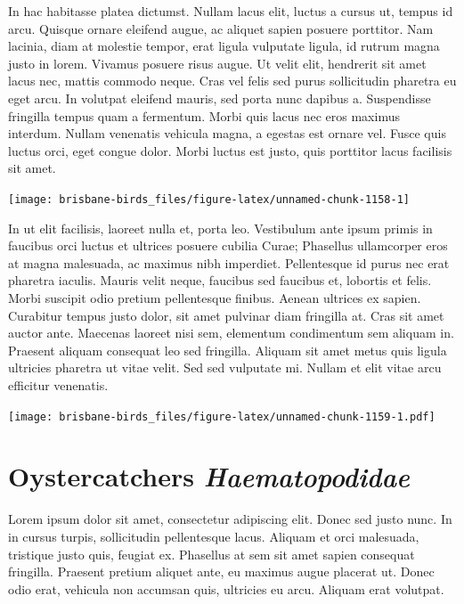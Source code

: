 \documentclass[]{book}
\let\origfigure\figure
\let\endorigfigure\endfigure
\renewenvironment{figure}[1][2] {
  \expandafter\origfigure\expandafter[H]
} {
  \endorigfigure
}
\begin{document}
In hac habitasse platea dictumst. Nullam lacus elit, luctus a cursus ut,
tempus id arcu. Quisque ornare eleifend augue, ac aliquet sapien posuere
porttitor. Nam lacinia, diam at molestie tempor, erat ligula vulputate
ligula, id rutrum magna justo in lorem. Vivamus posuere risus augue. Ut
velit elit, hendrerit sit amet lacus nec, mattis commodo neque. Cras vel
felis sed purus sollicitudin pharetra eu eget arcu. In volutpat eleifend
mauris, sed porta nunc dapibus a. Suspendisse fringilla tempus quam a
fermentum. Morbi quis lacus nec eros maximus interdum. Nullam venenatis
vehicula magna, a egestas est ornare vel. Fusce quis luctus orci, eget
congue dolor. Morbi luctus est justo, quis porttitor lacus facilisis sit
amet.

\begin{figure}
\texttt{[image: brisbane-birds\_files/figure-latex/unnamed-chunk-1158-1]} \caption{insert figure caption}\label{fig:unnamed-chunk-1158}
\end{figure}

In ut elit facilisis, laoreet nulla et, porta leo. Vestibulum ante ipsum
primis in faucibus orci luctus et ultrices posuere cubilia Curae;
Phasellus ullamcorper eros at magna malesuada, ac maximus nibh
imperdiet. Pellentesque id purus nec erat pharetra iaculis. Mauris velit
neque, faucibus sed faucibus et, lobortis et felis. Morbi suscipit odio
pretium pellentesque finibus. Aenean ultrices ex sapien. Curabitur
tempus justo dolor, sit amet pulvinar diam fringilla at. Cras sit amet
auctor ante. Maecenas laoreet nisi sem, elementum condimentum sem
aliquam in. Praesent aliquam consequat leo sed fringilla. Aliquam sit
amet metus quis ligula ultricies pharetra ut vitae velit. Sed sed
vulputate mi. Nullam et elit vitae arcu efficitur venenatis.

\begin{figure}
\centering
\texttt{[image: brisbane-birds\_files/figure-latex/unnamed-chunk-1159-1.pdf]}
\caption{\label{fig:unnamed-chunk-1159}insert figure caption}
\end{figure}

\chapter{\texorpdfstring{Oystercatchers
\emph{Haematopodidae}}{Oystercatchers Haematopodidae}}\label{oystercatchers-haematopodidae}

Lorem ipsum dolor sit amet, consectetur adipiscing elit. Donec sed justo
nunc. In in cursus turpis, sollicitudin pellentesque lacus. Aliquam et
orci malesuada, tristique justo quis, feugiat ex. Phasellus at sem sit
amet sapien consequat fringilla. Praesent pretium aliquet ante, eu
maximus augue placerat ut. Donec odio erat, vehicula non accumsan quis,
ultricies eu arcu. Aliquam erat volutpat.
\end{document}
